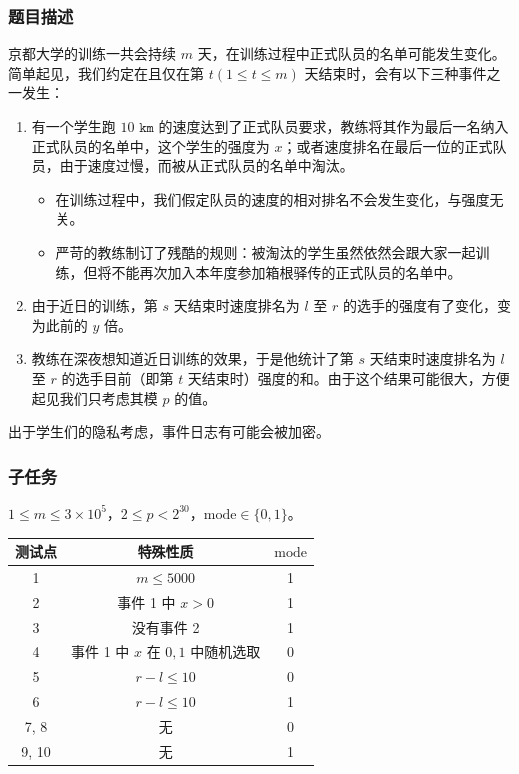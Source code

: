 		\subsubsection{题目描述}
			\par 京都大学的训练一共会持续 $m$ 天，在训练过程中正式队员的名单可能发生变化。简单起见，我们约定在且仅在第 $t(1\leq t\leq m)$ 天结束时，会有以下三种事件之一发生：
			\begin{enumerate}
				\item 有一个学生跑 $10\texttt{ km}$ 的速度达到了正式队员要求，教练将其作为最后一名纳入正式队员的名单中，这个学生的强度为 $x$；或者速度排名在最后一位的正式队员，由于速度过慢，而被从正式队员的名单中淘汰。
					\begin{itemize}
						\item 在训练过程中，我们假定队员的速度的相对排名不会发生变化，与强度无关。
						\item 严苛的教练制订了残酷的规则：被淘汰的学生虽然依然会跟大家一起训练，但将不能再次加入本年度参加箱根驿传的正式队员的名单中。
					\end{itemize}
				\item 由于近日的训练，第 $s$ 天结束时速度排名为 $l$ 至 $r$ 的选手的强度有了变化，变为此前的 $y$ 倍。
				\item 教练在深夜想知道近日训练的效果，于是他统计了第 $s$ 天结束时速度排名为 $l$ 至 $r$ 的选手目前（即第 $t$ 天结束时）强度的和。由于这个结果可能很大，方便起见我们只考虑其模 $p$ 的值。		   
			\end{enumerate}
			\par 出于学生们的隐私考虑，事件日志有可能会被加密。
		\subsubsection{子任务}
			\par $1\leq m\leq 3\times 10^5$，$2\leq p<2^{30}$，$\text{mode}\in\{0,1\}$。
			\begin{table}[!ht]
				\centering
				\begin{tabular}{|c|c|c|}
				\hline
					测试点 & 特殊性质 & $\text{mode}$ \\ \hline
					1 & $m\leq 5000$ & 1 \\ \hline
					2 & 事件 1 中 $x>0$ & 1 \\ \hline
					3 & 没有事件 2 & 1 \\ \hline
					4 & 事件 1 中 $x$ 在 $0,1$ 中随机选取 & 0 \\ \hline
					5 & $r-l\leq 10$ & 0 \\ \hline
					6 & $r-l\leq 10$ & 1 \\ \hline
					7, 8 & 无 & 0 \\ \hline
					9, 10 & 无 & 1 \\ \hline
				\end{tabular}
			\end{table}

